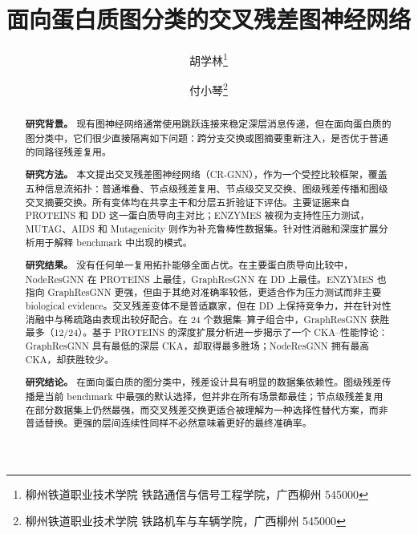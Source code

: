 \documentclass[12pt,a4paper]{ctexart}
\title{\heiti 面向蛋白质图分类的交叉残差图神经网络}
\author{胡学林\thanks{柳州铁道职业技术学院 铁路通信与信号工程学院，广西柳州 545000}}
\author{付小琴\thanks{柳州铁道职业技术学院 铁路机车与车辆学院，广西柳州 545000}}
\date{}
\begin{document}
\maketitle

\begin{abstract}
\textbf{研究背景。} 现有图神经网络通常使用跳跃连接来稳定深层消息传递，但在面向蛋白质的图分类中，它们很少直接隔离如下问题：跨分支交换或图摘要重新注入，是否优于普通的同路径残差复用。

\textbf{研究方法。} 本文提出交叉残差图神经网络（CR-GNN），作为一个受控比较框架，覆盖五种信息流拓扑：普通堆叠、节点级残差复用、节点级交叉交换、图级残差传播和图级交叉摘要交换。所有变体均在共享主干和分层五折验证下评估。主要证据来自 PROTEINS 和 DD 这一蛋白质导向主对比；ENZYMES 被视为支持性压力测试，MUTAG、AIDS 和 Mutagenicity 则作为补充鲁棒性数据集。针对性消融和深度扩展分析用于解释 benchmark 中出现的模式。

\textbf{研究结果。} 没有任何单一复用拓扑能够全面占优。在主要蛋白质导向比较中，NodeResGNN 在 PROTEINS 上最佳，GraphResGNN 在 DD 上最佳。ENZYMES 也指向 GraphResGNN 更强，但由于其绝对准确率较低，更适合作为压力测试而非主要 biological evidence。交叉残差变体不是普适赢家，但在 DD 上保持竞争力，并在针对性消融中与稀疏路由表现出较好配合。在 24 个数据集--算子组合中，GraphResGNN 获胜最多（12/24）。基于 PROTEINS 的深度扩展分析进一步揭示了一个 CKA--性能悖论：GraphResGNN 具有最低的深层 CKA，却取得最多胜场；NodeResGNN 拥有最高 CKA，却获胜较少。

\textbf{研究结论。} 在面向蛋白质的图分类中，残差设计具有明显的数据集依赖性。图级残差传播是当前 benchmark 中最强的默认选择，但并非在所有场景都最佳；节点级残差复用在部分数据集上仍然最强，而交叉残差交换更适合被理解为一种选择性替代方案，而非普适替换。更强的层间连续性同样不必然意味着更好的最终准确率。
\end{abstract}

\tableofcontents
\newpage











\end{document}
